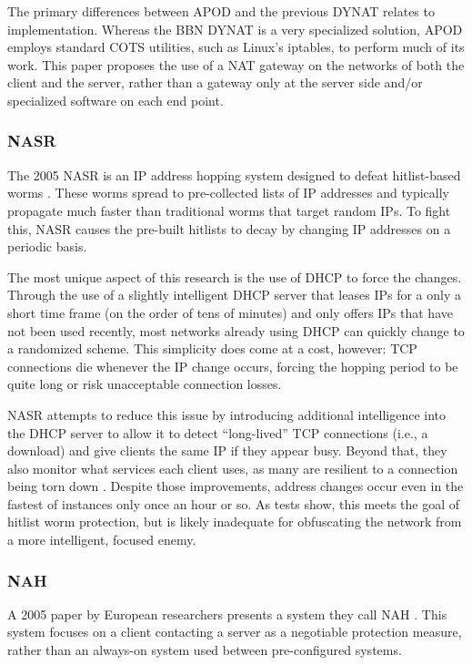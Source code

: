 \par The primary differences between APOD and the previous DYNAT relates to implementation. Whereas the BBN DYNAT is a very specialized solution, \ac{APOD} employs standard \ac{COTS} utilities, such as Linux's iptables, to perform much of its work. This paper proposes the use of a \ac{NAT} gateway on the networks of both the client and the server, rather than a gateway only at the server side and/or specialized software on each end point.

\subsubsection{\acf{NASR}}
\par The 2005 \acf{NASR} is an \ac{IP} address hopping system designed to defeat hitlist-based worms \cite{NASR}. These worms spread to pre-collected lists of \ac{IP} addresses and typically propagate much faster than traditional worms that target random \acp{IP}. To fight this, \ac{NASR} causes the pre-built hitlists to decay by changing IP addresses on a periodic basis.

\par The most unique aspect of this research is the use of \ac{DHCP} to force the changes. Through the use of a slightly intelligent \ac{DHCP} server that leases \acp{IP} for a only a short time frame (on the order of tens of minutes) and only offers \acp{IP} that have not been used recently, most networks already using DHCP can quickly change to a randomized scheme. This simplicity does come at a cost, however: \ac{TCP} connections die whenever the IP change occurs, forcing the hopping period to be quite long or risk unacceptable connection losses.

\par \ac{NASR} attempts to reduce this issue by introducing additional intelligence into the DHCP server to allow it to detect ``long-lived'' TCP connections (i.e., a download) and give clients the same IP if they appear busy. Beyond that, they also monitor what services each client uses, as many are resilient to a connection being torn down \cite{NASR}. Despite those improvements, address changes occur even in the fastest of instances only once an hour or so. As tests show, this meets the goal of hitlist worm protection, but is likely inadequate for obfuscating the network from a more intelligent, focused enemy.

\subsubsection{\acf{NAH}}
\par A 2005 paper by European researchers presents a system they call \acf{NAH} \cite{NAH}. This system focuses on a client contacting a server as a negotiable protection measure, rather than an always-on system used between pre-configured systems.

